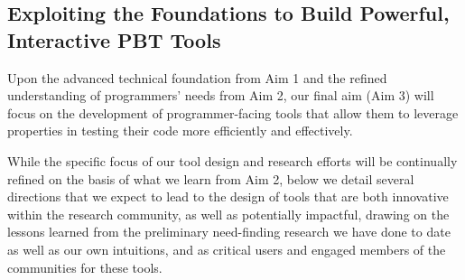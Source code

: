 \subsection{Exploiting the Foundations to Build Powerful, Interactive PBT Tools }
\label{sec:tools}

Upon the advanced technical foundation from Aim 1 and the refined understanding
of programmers' needs from Aim 2, our final aim (Aim 3) will focus on the
development of programmer-facing tools that allow them to leverage properties in
testing their code more efficiently and effectively.

While the specific focus of our tool design and research efforts will be
continually refined on the basis of what we learn from Aim 2, below we detail
several directions that we expect to lead to the design of tools that are both
innovative within the research community, as well as potentially impactful,
drawing on the lessons learned from the preliminary need-finding research we
have done to date as well as our own intuitions, and as critical users and
engaged members of the communities for these tools.



 


